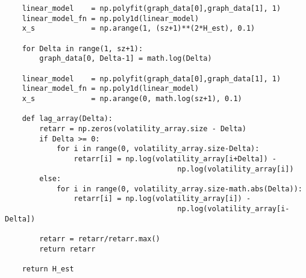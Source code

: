 \begin{verbatim}
    linear_model    = np.polyfit(graph_data[0],graph_data[1], 1)
    linear_model_fn = np.poly1d(linear_model)
    x_s             = np.arange(1, (sz+1)**(2*H_est), 0.1)

    for Delta in range(1, sz+1):
        graph_data[0, Delta-1] = math.log(Delta)

    linear_model    = np.polyfit(graph_data[0],graph_data[1], 1)
    linear_model_fn = np.poly1d(linear_model)
    x_s             = np.arange(0, math.log(sz+1), 0.1)
        
    def lag_array(Delta):
        retarr = np.zeros(volatility_array.size - Delta) 
        if Delta >= 0:
            for i in range(0, volatility_array.size-Delta):
                retarr[i] = np.log(volatility_array[i+Delta]) - 
                                        np.log(volatility_array[i])
        else:
            for i in range(0, volatility_array.size-math.abs(Delta)):
                retarr[i] = np.log(volatility_array[i]) - 
                                        np.log(volatility_array[i-Delta])

        retarr = retarr/retarr.max()
        return retarr

    return H_est
\end{verbatim}  